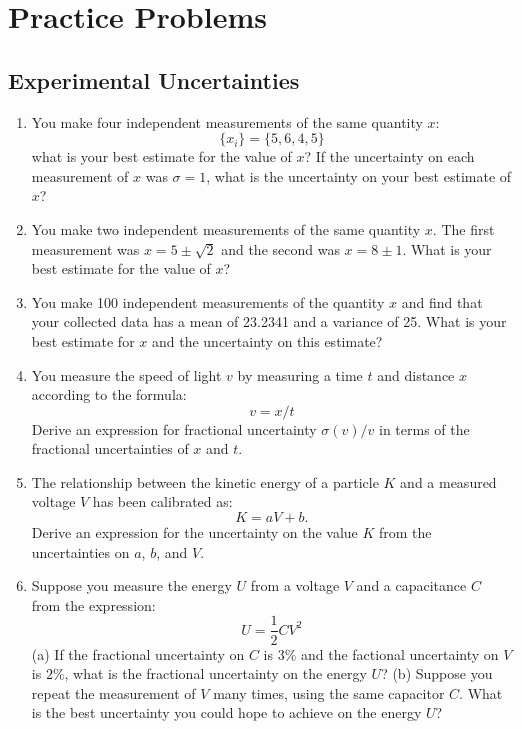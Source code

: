 \documentclass[12pt,oneside]{book}
\begin{document}
\appendix

\chapter{Practice Problems}
\section{Experimental Uncertainties}

\begin{enumerate}

\item You make four independent measurements of the same quantity $x$:
\begin{displaymath}
\{ x_i \} = \{ 5,6,4,5\}
\end{displaymath}
what is your best estimate for the value of $x$?  If the uncertainty on each measurement of $x$ was $\sigma = 1$, what is the uncertainty on your best estimate of $x$?

\item You make two independent measurements of the same quantity $x$.  The first measurement was $x = 5 \pm \sqrt{2}$ and the second was $x = 8 \pm 1$.  What is your best estimate for the value of $x$?  

\item You make 100 independent measurements of the quantity $x$ and find that your collected data has a mean of 23.2341 and a variance of 25.  What is your best estimate for $x$ and the uncertainty on this estimate?

\item You measure the speed of light $v$ by measuring a time $t$ and distance $x$ according to the formula:
\begin{displaymath}
v = x / t
\end{displaymath}
Derive an expression for fractional uncertainty $\sigma(v)/v$ in terms of the fractional uncertainties of $x$ and $t$.

\item The relationship between the kinetic energy of a particle $K$ and a measured voltage $V$ has been calibrated as:
\begin{displaymath}
K = a V + b.
\end{displaymath}
Derive an expression for the uncertainty on the value $K$ from the uncertainties on $a$, $b$, and $V$.

\item Suppose you measure the energy $U$ from a voltage $V$ and a capacitance $C$ from the expression:
\begin{displaymath}
U = \frac{1}{2} C V^2
\end{displaymath}
(a) If the fractional uncertainty on $C$ is $3\%$ and the factional uncertainty on $V$ is $2\%$, what is the fractional uncertainty on the energy $U$?  (b) Suppose you repeat the measurement of $V$ many times, using the same capacitor $C$.   What is the best uncertainty you could hope to achieve on the energy $U$?


\end{enumerate}
\end{document}
